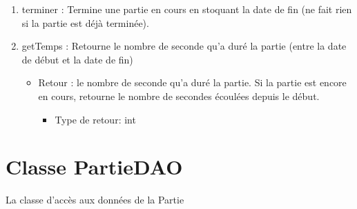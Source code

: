 \begin{itemize}
  \begin{enumerate}
  \item terminer : Termine une partie en cours en stoquant la date de fin (ne fait rien si la partie est déjà terminée).
  \item getTemps : Retourne le nombre de seconde qu'a duré la partie (entre la date de début et la date de fin)
    \begin{itemize}
    \item Retour : le nombre de seconde qu'a duré la partie. Si la partie est encore en cours, retourne le nombre de secondes écoulées depuis le début.
      \begin{itemize}
      \item Type de retour: int
      \end{itemize}
    \end{itemize}
  \end{enumerate}
  
\end{itemize}

\section{Classe PartieDAO}

La classe d'accès aux données de la Partie

